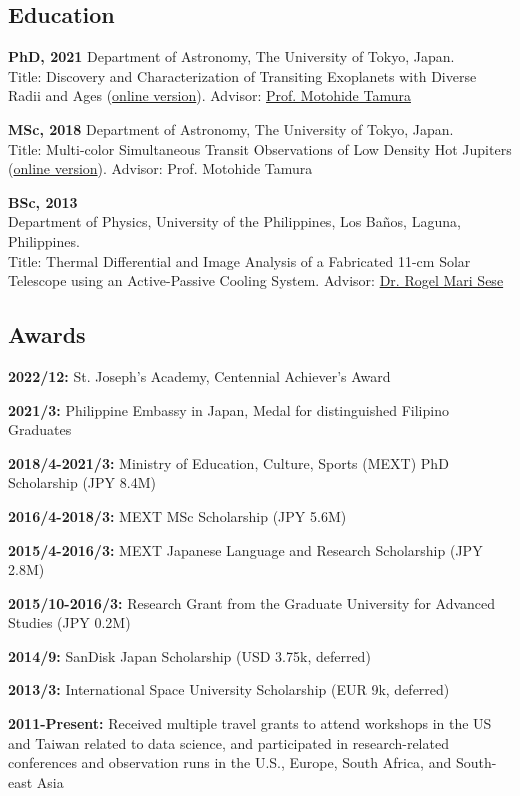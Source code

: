 \documentclass[11pt,letterpaper]{article}
\begin{document}
\subsection{Education}
\begin{list}{}{\cvlist}
    \item
        \textbf{PhD, 2021} Department of Astronomy, The University of Tokyo, Japan.\\
        Title: Discovery and Characterization of Transiting Exoplanets with Diverse Radii and Ages (\href{\phdthesisurl}{online version}).
        Advisor: \href{\tamuraurl}{Prof. Motohide Tamura}
    \item
        \textbf{MSc, 2018} Department of Astronomy, The University of Tokyo, Japan.\\
        Title: Multi-color Simultaneous Transit Observations of Low Density Hot Jupiters (\href{https://github.com/jpdeleon/thesis-master/tree/master}{online version}).
        Advisor: Prof. Motohide Tamura
    \item
        \textbf{BSc, 2013}\\
        Department of Physics, University of the Philippines, Los Ba\~nos, Laguna, Philippines.\\
        Title: Thermal Differential and Image Analysis of a Fabricated 11-cm Solar Telescope using an Active-Passive Cooling System.
        Advisor: \href{\seseurl}{Dr. Rogel Mari Sese}      
\end{list}

\subsection{Awards}
\begin{list}{}{\cvlist}
    \item \textbf{2022/12:} St. Joseph's Academy, Centennial Achiever's Award
    \item \textbf{2021/3:} Philippine Embassy in Japan, Medal for distinguished Filipino Graduates
    \item \textbf{2018/4-2021/3:} Ministry of Education, Culture, Sports (MEXT) PhD Scholarship (JPY 8.4M)
    \item \textbf{2016/4-2018/3:} MEXT MSc Scholarship (JPY 5.6M)
    \item \textbf{2015/4-2016/3:} MEXT Japanese Language and Research Scholarship (JPY 2.8M)
    \item \textbf{2015/10-2016/3:} Research Grant from the Graduate University for Advanced Studies (JPY 0.2M)
    \item \textbf{2014/9:} SanDisk Japan Scholarship (USD 3.75k, deferred)
    \item \textbf{2013/3:} International Space University Scholarship (EUR 9k, deferred)
    \item \textbf{2011-Present:} Received multiple travel grants to attend workshops in the US and Taiwan related to data science, and participated in research-related conferences and observation runs in the U.S., Europe, South Africa, and South-east Asia
\end{list}
\end{document}

